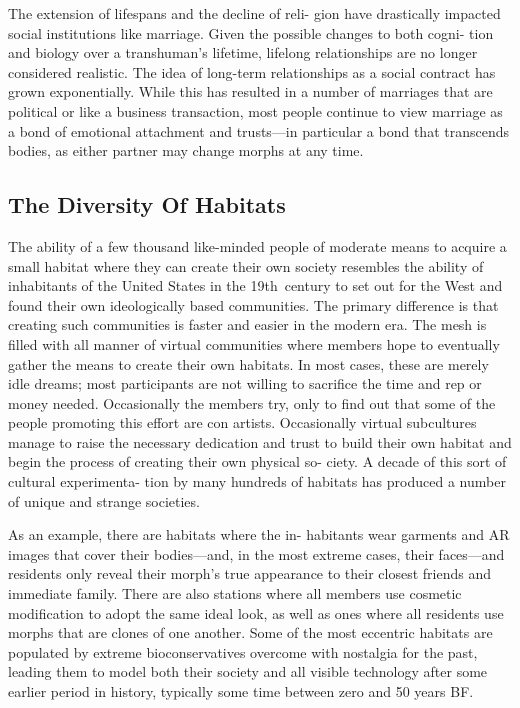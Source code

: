 The extension of lifespans and the decline of reli-
gion have drastically impacted social institutions like 
marriage. Given the possible changes to both cogni-
tion and biology over a transhuman's lifetime, lifelong 
relationships are no longer considered realistic. The 
idea of long-term relationships as a social contract 
has grown exponentially. While this has resulted in 
a number of marriages that are political or like a 
business transaction, most people continue to view 
marriage as a bond of emotional attachment and 
trusts—in particular a bond that transcends bodies, 
as either partner may change morphs at any time. 

\subsection{The Diversity Of Habitats}

The ability of a few thousand like-minded people of 
moderate means to acquire a small habitat where 
they can create their own society resembles the 
ability of inhabitants of the United States in the 
19th century to set out for the West and found their 
own ideologically based communities. The primary 
difference is that creating such communities is faster 
and easier in the modern era. The mesh is filled with 
all manner of virtual communities where members 
hope to eventually gather the means to create their 
own habitats. In most cases, these are merely idle 
dreams; most participants are not willing to sacrifice 
the time and rep or money needed. Occasionally the 
members try, only to find out that some of the people 
promoting this effort are con artists. Occasionally 
virtual subcultures manage to raise the necessary 
dedication and trust to build their own habitat and 
begin the process of creating their own physical so-
ciety. A decade of this sort of cultural experimenta-
tion by many hundreds of habitats has produced a 
number of unique and strange societies.

As an example, there are habitats where the in-
habitants wear garments and AR images that cover 
their bodies—and, in the most extreme cases, their 
faces—and residents only reveal their morph's true 
appearance to their closest friends and immediate 
family. There are also stations where all members use 
cosmetic modification to adopt the same ideal look, 
as well as ones where all residents use morphs that 
are clones of one another. Some of the most eccentric 
habitats are populated by extreme bioconservatives 
overcome with nostalgia for the past, leading them 
to model both their society and all visible technology 
after some earlier period in history, typically some 
time between zero and 50 years BF.

